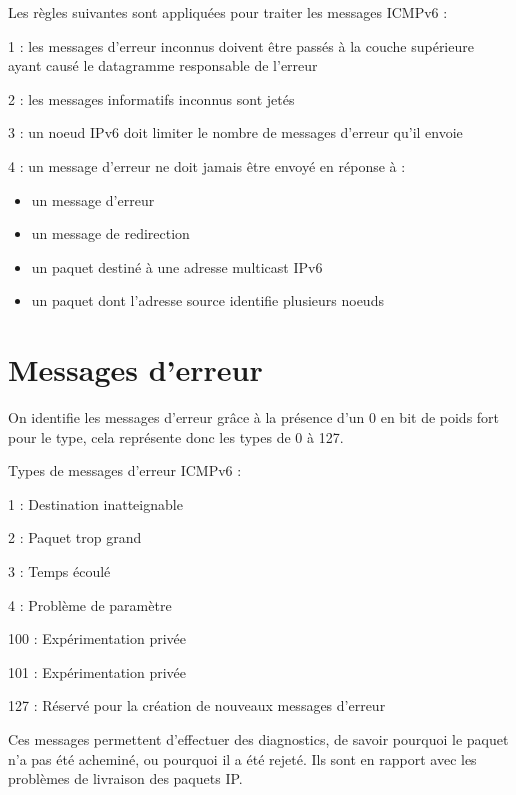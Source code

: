 Les règles suivantes sont appliquées pour traiter les messages ICMPv6 :
    \begin{list}{}{}
    	\item 1 : les messages d'erreur inconnus doivent être passés à la couche supérieure ayant causé le datagramme responsable de l'erreur
        \item 2 : les messages informatifs inconnus sont jetés
        \item 3 : un noeud IPv6 doit limiter le nombre de messages d'erreur qu'il envoie
        \item 4 : un message d'erreur ne doit jamais être envoyé en réponse à :
        	    \begin{itemize}
					\item un message d'erreur
					\item un message de redirection
                    \item un paquet destiné à une adresse multicast IPv6
                    \item un paquet dont l'adresse source identifie plusieurs noeuds
				\end{itemize}
    \end{list}
    
\section{Messages d'erreur}

On identifie les messages d’erreur grâce à la présence d’un 0 en bit de poids fort pour le type, cela représente donc les types de 0 à 127.
\medskip

Types de messages d'erreur ICMPv6 :         
    \begin{list}{}{}
    	\item 1 : Destination inatteignable
        \item 2 : Paquet trop grand 
        \item 3 : Temps écoulé
        \item 4 : Problème de paramètre
        \item 100 : Expérimentation privée
        \item 101 : Expérimentation privée
        \item 127 : Réservé pour la création de nouveaux messages d'erreur
    \end{list}
\medskip

Ces messages permettent d'effectuer des diagnostics, de savoir pourquoi le paquet n'a pas été acheminé, ou pourquoi il a été rejeté. Ils sont en rapport avec les problèmes de livraison des paquets IP.

